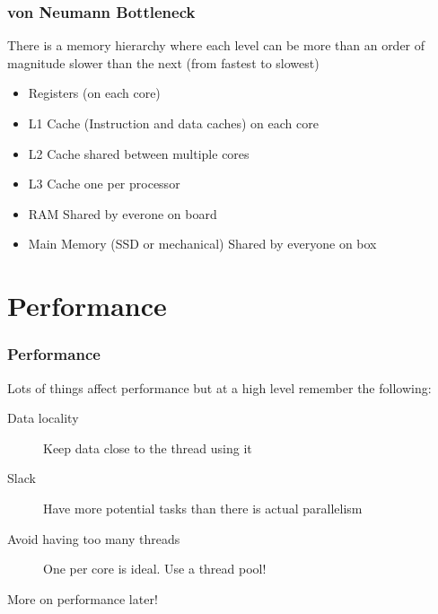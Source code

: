 \documentclass{beamer}
\begin{document}
\begin{frame}
	\frametitle{von Neumann Bottleneck}
	There is a memory hierarchy where each level can be more than an order of magnitude slower than the next (from fastest to slowest)
	\begin{itemize}
	\item Registers (on each core)
	\item L1 Cache (Instruction and data caches) on each core
	\item L2 Cache shared between multiple cores
	\item L3 Cache one per processor
	\item RAM Shared by everone on board
	\item Main Memory (SSD or mechanical) Shared by everyone on box
	\end{itemize}
	
\end{frame}

\section{Performance}
\begin{frame}
	\frametitle{Performance}
	Lots of things affect performance but at a high level remember the following:
	\begin{description}
	\item[Data locality] Keep data close to the thread using it
	\item[Slack] Have more potential tasks than there is actual parallelism
	\item[Avoid having too many threads] One per core is ideal.
Use a thread pool!
	\end{description}
More on performance later!
\end{frame}
    
\end{document}
